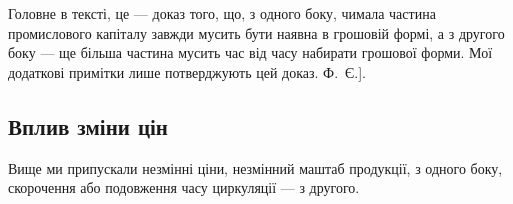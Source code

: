 Головне в тексті, це — доказ того, що, з одного боку, чимала частина
промислового капіталу завжди мусить бути наявна в грошовій формі,
а з другого боку — ще більша частина мусить час від часу набирати
грошової форми. Мої додаткові примітки лише потверджують цей доказ. Ф.~Є.].

\subsection{Вплив зміни цін}

Вище ми припускали незмінні ціни, незмінний маштаб продукції, з
одного боку, скорочення або подовження часу циркуляції — з другого.
\parbreak{}  %
